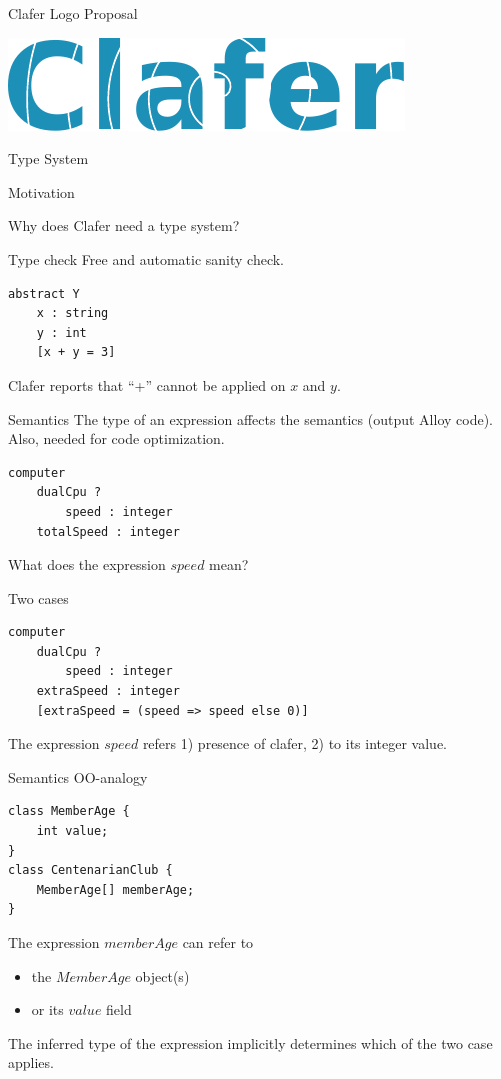 \documentclass[table,15pt,t]{beamer}
\newcommand{\vmiddle}[1]{
  \vspace{\stretch{1}}
  #1
  \vspace{\stretch{1}}
}
\newcommand{\interframe}[1]{
\begin{frame}{}
\vmiddle{\hmiddle{\Huge #1}}
\end{frame}
}
\newcommand{\hmiddle}[1]{
  \begin{center}#1\end{center}
}
\begin{document}
\begin{frame}{Clafer Logo Proposal}
\vmiddle{\includegraphics[width=\textwidth]{figs/logo}}
\end{frame}

\interframe{Type System}

\begin{frame}{Motivation}
\vmiddle{Why does Clafer need a type system?}
\end{frame}

\begin{frame}[fragile,c]{Type check}
Free and automatic sanity check.
\vfill \begin{lstlisting}
abstract Y
    x : string
    y : int
    [x + y = 3]
\end{lstlisting}
Clafer reports that ``+'' cannot be applied on $x$ and $y$.
\end{frame}

\begin{frame}[fragile,c]{Semantics}
The type of an expression affects the semantics (output Alloy code). Also, needed for code optimization.
\vfill \begin{lstlisting}
computer
    dualCpu ?
        speed : integer
    totalSpeed : integer
\end{lstlisting}
What does the expression $speed$ mean?
\end{frame}

\begin{frame}[fragile,c]{Two cases}
\begin{lstlisting}
computer
    dualCpu ?
        speed : integer
    extraSpeed : integer
    [extraSpeed = (speed => speed else 0)]
\end{lstlisting}
The expression $speed$ refers 1) presence of clafer, 2) to its integer value.
\end{frame}

\begin{frame}[fragile,c]{Semantics OO-analogy}
\lstset{language=Java}
\begin{lstlisting}
class MemberAge {
    int value;
}
class CentenarianClub {
    MemberAge[] memberAge;
}
\end{lstlisting}
The expression $memberAge$ can refer to
\begin{itemize}
\item the $MemberAge$ object(s)
\item or its $value$ field
\end{itemize}

The inferred type of the expression implicitly determines which of the two case applies.
\end{frame}
\end{document}
